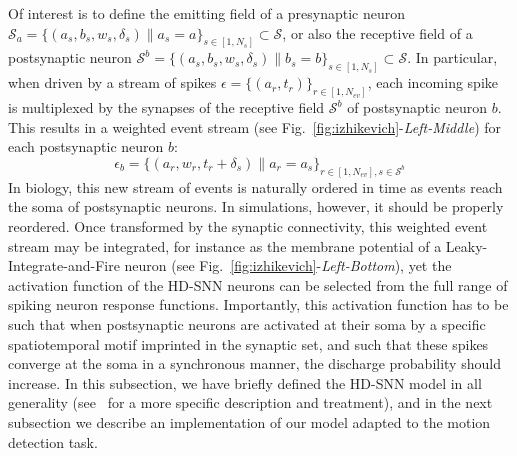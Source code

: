 \documentclass[default]{sn-jnl}%
\theoremstyle{thmstyleone}%
\theoremstyle{thmstyletwo}%
\theoremstyle{thmstylethree}%
\newcommand{\seeFig}[1]{see Fig.~\ref{fig:#1}}%
\newcommand{\presynaddr}{a} %
\newcommand{\postsynaddr}{b} %
\newcommand{\numevent}{N_{ev}} %
\newcommand{\arank}{r} %
\newcommand{\synapse}{\mathcal{S}} %
\newcommand{\synapticweight}{w} %
\newcommand{\synapticdelay}{\delta} %
\newcommand{\ranksyn}{s} %
\newcommand{\Nsyn}{N_{s}} %
\newcommand{\timev}{t} %
\newcommand{\event}{\epsilon} %
\begin{document}
Of interest is to define the emitting field of a presynaptic neuron $\synapse_\presynaddr = \{(\presynaddr_\ranksyn, \postsynaddr_\ranksyn, \synapticweight_\ranksyn, \synapticdelay_\ranksyn) \| \presynaddr_\ranksyn=\presynaddr\}_{\ranksyn \in [1,\Nsyn]} \subset \synapse$, or also the receptive field of a postsynaptic neuron $\synapse^\postsynaddr = \{(\presynaddr_\ranksyn, \postsynaddr_\ranksyn, \synapticweight_\ranksyn, \synapticdelay_\ranksyn) \| \postsynaddr_\ranksyn=\postsynaddr\}_{\ranksyn \in [1,\Nsyn]}  \subset \synapse$. In particular, when driven by a stream of spikes $\event = \{(\presynaddr_\arank, \timev_\arank)\}_{\arank \in [1,\numevent]}$, each incoming spike is multiplexed by the synapses of the receptive field $\synapse^\postsynaddr$ of postsynaptic neuron $\postsynaddr$. This results in a weighted event stream (\seeFig{izhikevich}-\textit{Left-Middle}) for each postsynaptic neuron $\postsynaddr$: 
%
\begin{equation}\label{eq:stream_b}
\event_\postsynaddr = \{(\presynaddr_\arank, \synapticweight_\arank, \timev_\arank+\synapticdelay_\ranksyn) \| \presynaddr_\arank = \presynaddr_\ranksyn \}_{\arank \in [1,\numevent], \ranksyn \in \synapse^\postsynaddr}
\end{equation}
%
In biology, this new stream of events is naturally ordered in time as events reach the soma of postsynaptic neurons. In simulations, however, it should be properly reordered. Once transformed by the synaptic connectivity, this weighted event stream may be integrated, for instance as the membrane potential of a Leaky-Integrate-and-Fire neuron (\seeFig{izhikevich}-\textit{Left-Bottom}), yet the activation function of the HD-SNN neurons can be selected from the full range of spiking neuron response functions. Importantly, this activation function has to be such that when postsynaptic neurons are activated at their soma by a specific spatiotemporal motif imprinted in the synaptic set, and such that these spikes converge at the soma in a synchronous manner, the discharge probability should increase. In this subsection, we have briefly defined the HD-SNN model in all generality (see~\citep{Perrinet23ICANN} for a more specific description and treatment), and in the next subsection we describe an implementation of our model adapted to the motion detection task. 
%
\end{document}

